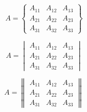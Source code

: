 \documentclass[12pt,a4paper,twoside]{report}
\begin{document}
\begin{equation}
A =
\begin{Bmatrix}
A_{11} & A_{12} & A_{13} \\
A_{21} & A_{22} & A_{23} \\
A_{31} & A_{32} & A_{33}
\end{Bmatrix}
\end{equation}

\begin{equation}
A =
\begin{vmatrix}
A_{11} & A_{12} & A_{13} \\
A_{21} & A_{22} & A_{23} \\
A_{31} & A_{32} & A_{33}
\end{vmatrix}
\end{equation}

\begin{equation}
A =
\begin{Vmatrix}
A_{11} & A_{12} & A_{13} \\
A_{21} & A_{22} & A_{23} \\
A_{31} & A_{32} & A_{33}
\end{Vmatrix}
\end{equation}
\end{document}
